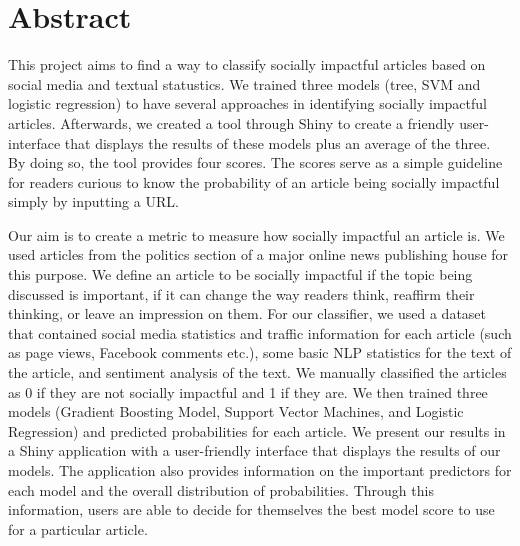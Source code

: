 \documentclass[10pt,letterpaper]{article}
\date{}
\newcommand{\getIndex}[2]{
  \ForEach{,}{\IfEq{#1}{\thislevelitem}{\number\thislevelcount\ExitForEach}{}}{#2}
}
\newcommand{\getAff}[1]{
  \getIndex{#1}{Smith College}
}
\begin{document}
\vspace*{0.2in}

\section*{Abstract}

This project aims to find a way to classify socially impactful articles
based on social media and textual statustics. We trained three models
(tree, SVM and logistic regression) to have several approaches in
identifying socially impactful articles. Afterwards, we created a tool
through Shiny to create a friendly user-interface that displays the
results of these models plus an average of the three. By doing so, the
tool provides four scores. The scores serve as a simple guideline for
readers curious to know the probability of an article being socially
impactful simply by inputting a URL.

Our aim is to create a metric to measure how socially impactful an
article is. We used articles from the politics section of a major online
news publishing house for this purpose. We define an article to be
socially impactful if the topic being discussed is important, if it can
change the way readers think, reaffirm their thinking, or leave an
impression on them. For our classifier, we used a dataset that contained
social media statistics and traffic information for each article (such
as page views, Facebook comments etc.), some basic NLP statistics for
the text of the article, and sentiment analysis of the text. We manually
classified the articles as 0 if they are not socially impactful and 1 if
they are. We then trained three models (Gradient Boosting Model, Support
Vector Machines, and Logistic Regression) and predicted probabilities
for each article. We present our results in a Shiny application with a
user-friendly interface that displays the results of our models. The
application also provides information on the important predictors for
each model and the overall distribution of probabilities. Through this
information, users are able to decide for themselves the best model
score to use for a particular article.
\end{document}
